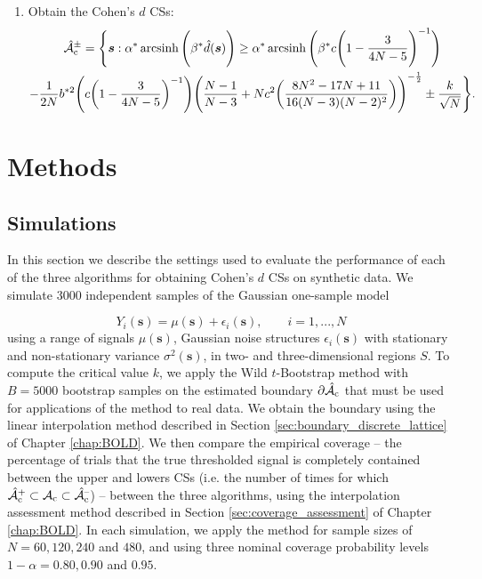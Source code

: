 \begin{algorithm}
\begin{enumerate}
\item Obtain the Cohen's $d$ CSs:
\begin{multline}
\label{eq:transformed_cohens_CSs_again}
    \operatorname{\hat{\mathcal{A}}_{c}^\pm} = \Bigg\{\bm{s} : \alpha^{*} \operatorname{arcsinh}\Bigg(\beta^{*} \hat{d}(\bm{s}) \Bigg) \geq \alpha^{*} \operatorname{arcsinh}\Bigg(\beta^{*} c \Bigg(1 - \frac{3}{4N -5}\Bigg)^{-1} \Bigg) \\
    - \frac{1}{2N}b^{*2}\Bigg(c \bigg(1 - \frac{3}{4N - 5}\bigg)^{-1} \Bigg)\Bigg(\frac{N-1}{N-3} + N c^{2} \bigg(\frac{8N^{2} - 17N + 11}{16(N-3)(N-2)^{2}} \bigg)\Bigg)^{-\frac{1}{2}} \pm \frac{k}{\sqrt{N}} \Bigg\}. 
\end{multline}
\end{enumerate}
\end{algorithm}

\section{Methods}
\subsection{Simulations}
\label{sec:cohen_simulations}
In this section we describe the settings used to evaluate the performance of each of the three algorithms for obtaining Cohen's $d$ CSs on synthetic data. We simulate 3000 independent samples of the Gaussian one-sample model 

$$Y_{i}(\bm{s}) = \mu(\bm{s}) + \epsilon_{i}(\bm{s}), \qquad i = 1, ..., N$$
using a range of signals $\mu(\bm{s})$, Gaussian noise structures $\epsilon_{i}(\bm{s})$ with stationary and non-stationary variance $\sigma^{2}(\bm{s})$, in two- and three-dimensional regions $S$. To compute the critical value $k$, we apply the Wild $t$-Bootstrap method with $B = 5000$ bootstrap samples on the estimated boundary $\operatorname{\partial\hat{\mathcal{A}}_{c}}$ that must be used for applications of the method to real data. We obtain the boundary using the linear interpolation method described in Section \ref{sec:boundary_discrete_lattice} of Chapter \ref{chap:BOLD}. We then compare the empirical coverage -- the percentage of trials that the true thresholded signal is completely contained between the upper and lowers CSs (i.e. the number of times for which $\operatorname{\hat{\mathcal{A}}_{c}^+} \subset \operatorname{\mathcal{A}_{c}} \subset \operatorname{\hat{\mathcal{A}}_{c}^{\textrm{--}}}$) -- between the three algorithms, using the interpolation assessment method described in Section \ref{sec:coverage_assessment} of Chapter \ref{chap:BOLD}. In each simulation, we apply the method for sample sizes of $N = 60, 120, 240$ and $480$, and using three nominal coverage probability levels $1 - \alpha = 0.80, 0.90$ and $0.95$. 



